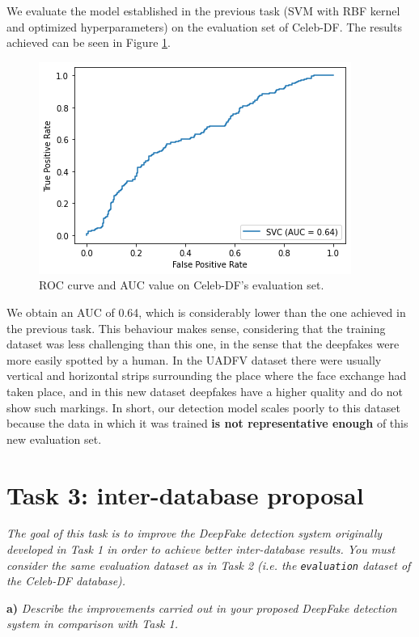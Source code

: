 \documentclass[11pt]{article}
\begin{document}
We evaluate the model established in the previous task (SVM with RBF kernel and optimized hyperparameters) on the evaluation set of Celeb-DF. The results achieved can be seen in Figure \ref{fig:t2}.

\begin{figure}[h!]
  \centering
  \includegraphics[width=.6\textwidth]{img/2-roc-celeb}
  \caption{ROC curve and AUC value on Celeb-DF's evaluation set.}
  \label{fig:t2}
\end{figure}

We obtain an AUC of 0.64, which is considerably lower than the one achieved in the previous task. This behaviour makes sense, considering that the training dataset was less challenging than this one, in the sense that the deepfakes were more easily spotted by a human. In the UADFV dataset there were usually vertical and horizontal strips surrounding the place where the face exchange had taken place, and in this new dataset deepfakes have a higher quality and do not show such markings. In short, our detection model scales poorly to this dataset because the data in which it was trained \textbf{is not representative enough} of this new evaluation set.


\section*{Task 3: inter-database proposal}

\textit{The goal of this task is to improve the DeepFake detection system originally developed in Task 1 in order to achieve better inter-database results. You must consider the same evaluation dataset as in Task 2 (i.e. the \texttt{evaluation} dataset of the Celeb-DF database).}

\textbf{a)} \textit{Describe the improvements carried out in your proposed DeepFake detection system in comparison with Task 1.}
\end{document}
